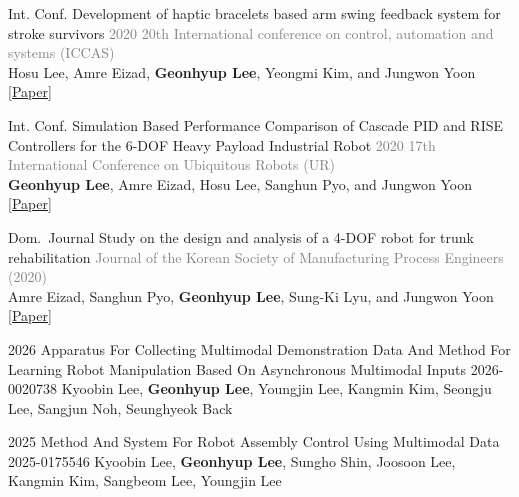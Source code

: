\documentclass[9pt]{developercv} %
\begin{document}
{\begin{entrylist}
    \entry
        {Int. Conf.}
        {Development of haptic bracelets based arm swing feedback system for stroke survivors} 
        {}
        {\vspace{0pt}
        \textcolor{gray}{2020 20th International conference on control, automation and systems (ICCAS)} \\
        Hosu Lee, Amre Eizad, \textbf{Geonhyup Lee}, Yeongmi Kim, and Jungwon Yoon\\
        \textcolor{blue}{\href{https://ieeexplore.ieee.org/abstract/document/9268318}{[Paper]}}
        }

    \entry
        {Int. Conf.}
        {Simulation Based Performance Comparison of Cascade PID and RISE Controllers for the 6-DOF Heavy Payload Industrial Robot} 
        {}
        {\vspace{0pt}
        \textcolor{gray}{2020 17th International Conference on Ubiquitous Robots (UR)} \\
        \textbf{Geonhyup Lee}, Amre Eizad, Hosu Lee, Sanghun Pyo, and Jungwon Yoon \\
        \textcolor{blue}{\href{https://ieeexplore.ieee.org/abstract/document/9144847}{[Paper]}}
        }

   \entry
        {Dom.\ Journal}
        {Study on the design and analysis of a 4-DOF robot for trunk rehabilitation} 
        {}
        {\vspace{0pt}
        \textcolor{gray}{Journal of the Korean Society of Manufacturing Process Engineers (2020)} \\
        Amre Eizad, Sanghun Pyo, \textbf{Geonhyup Lee}, Sung-Ki Lyu, and Jungwon Yoon  \\
        \textcolor{blue}{\href{https://koreascience.kr/article/JAKO202032555265607.page}{[Paper]}}
        }

\end{entrylist}
\begin{entrylist}

    \entry
        {2026}
        {Apparatus For Collecting Multimodal Demonstration Data And Method For Learning Robot Manipulation Based On Asynchronous Multimodal Inputs}
        {2026-0020738}
        {\vspace{-10pt}
             Kyoobin Lee, \textbf{Geonhyup Lee}, Youngjin Lee, Kangmin Kim, Seongju Lee, Sangjun Noh, Seunghyeok Back \\
            }

    \entry
        {2025}
        {Method And System For Robot Assembly Control Using Multimodal Data}
        {2025-0175546}
        {\vspace{-10pt}
             Kyoobin Lee, \textbf{Geonhyup Lee}, Sungho Shin, Joosoon Lee, Kangmin Kim, Sangbeom Lee, Youngjin Lee \\
            }
    

\end{entrylist}}
\end{document}
